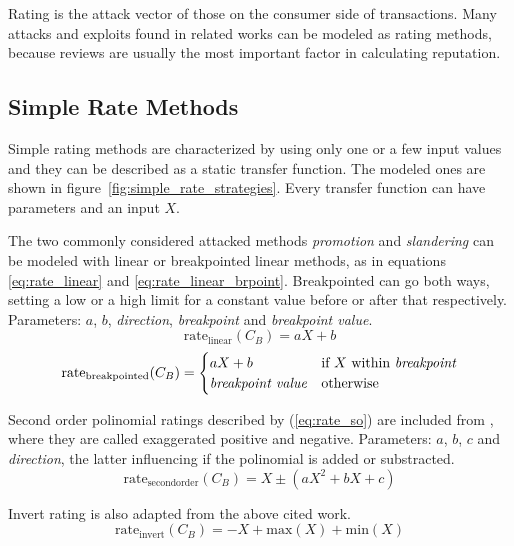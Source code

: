 \documentclass[%
    ]{\PathToTumTemplate/thesis/tum_thesis}
\begin{document}
Rating is the attack vector of those on the consumer side of transactions.
Many attacks and exploits found in related works can be modeled as rating methods, because reviews are usually the most important factor in calculating reputation.


\subsection{Simple Rate Methods}

Simple rating methods are characterized by using only one or a few input values and they can be described as a static transfer function.
The modeled ones are shown in figure~\ref{fig:simple_rate_strategies}.
Every transfer function can have parameters and an input $X$.

The two commonly considered attacked methods \emph{promotion} and \emph{slandering} can be modeled with linear or breakpointed linear methods, as in equations \ref{eq:rate_linear} and \ref{eq:rate_linear_brpoint}. Breakpointed can go both ways, setting a low or a high limit for a constant value before or after that respectively. Parameters: $a$, $b$, \emph{direction}, \emph{breakpoint} and \emph{breakpoint value}.
\begin{equation}\label{eq:rate_linear}
\mathrm{rate_{linear}}(C_B) = aX+b
\end{equation}
\begin{equation}\label{eq:rate_linear_brpoint}
\mathrm{rate_{breakpointed}}(C_B) = 
    \begin{cases}
      aX+b & \text{if $X$ within \emph{breakpoint}} \\
      \text{\emph{breakpoint value}} & \text{otherwise}\\
    \end{cases}
\end{equation}

Second order polinomial ratings described by (\ref{eq:rate_so}) are included from \cite{yu_detecting_2003}, where they are called exaggerated positive and negative.
Parameters: $a$, $b$, $c$ and \emph{direction}, the latter influencing if the polinomial is added or substracted.
\begin{equation}\label{eq:rate_so}
\mathrm{rate_{second order}}(C_B) = X \pm (aX^2+bX+c)
\end{equation}

Invert rating is also adapted from the above cited work.
\begin{equation}\label{eq:rate_invert}
\mathrm{rate_{invert}}(C_B) = -X + \mathrm{max}(X) + \mathrm{min}(X)
\end{equation}
\end{document}
